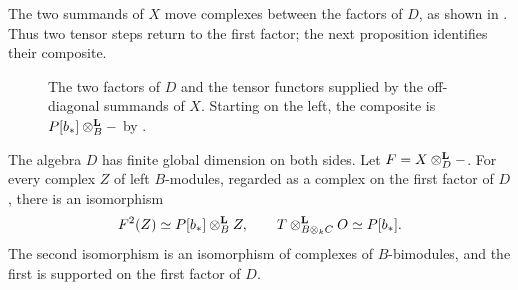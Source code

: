 The two summands of \(X\) move complexes between the factors of \(D\),
as shown in . Thus two tensor steps return to the
first factor; the next proposition identifies their composite.

\begin{figure}[htbp]
\centering
{}
\caption{The two factors of \(D\) and the tensor functors supplied by
the off-diagonal summands of \(X\). Starting on the left, the composite
is \(P[b_*]\otimes^{\mathbf L}_B-\) by .}
\label{fig:simulation}
\end{figure}

\begin{proposition}
\label{prop:ordinary-simulation}
The algebra \(D\) has finite global dimension on both sides.
Let \(F=X\otimes^{\mathbf L}_D-\).  For every complex \(Z\) of left
\(B\)-modules, regarded as a complex on the first factor of
\(D\), there is an isomorphism
\begin{equation}
\label{eq:compression}
F^2(Z)\simeq P[b_*]\otimes^{\mathbf L}_B Z,
\qquad
T\otimes^{\mathbf L}_{B\otimes_k C}O\simeq P[b_*].
\end{equation}
The second isomorphism is an isomorphism of complexes of
\(B\)-bimodules, and the first is supported on the first
factor of \(D\).
\end{proposition}

